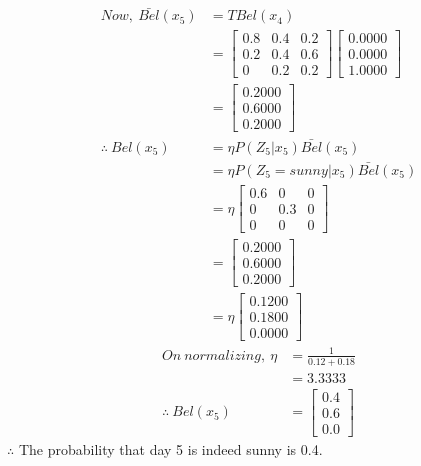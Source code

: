 \documentclass[a4paper,fleqn,11pt]{article}
\theoremstyle{mytheor}
\begin{document}
\begin{align*}
Now,\ \bar{Bel}(x_5) & = T Bel (x_4) \\
					  & = \begin{bmatrix}
								0.8 & 0.4 & 0.2 \\
								0.2 & 0.4 & 0.6 \\
								0   & 0.2 & 0.2
						  \end{bmatrix}
						  \begin{bmatrix}
								0.0000 \\
								0.0000 \\
								1.0000
						  \end{bmatrix} \\
					 & = \begin{bmatrix}
							0.2000 \\
							0.6000 \\
							0.2000
						 \end{bmatrix} \\
\therefore\ Bel(x_5) & = \eta P (Z_5 | x_{5}) \bar{Bel} (x_{5}) \\
					  & = \eta P (Z_5 = sunny | x_{5}) \bar{Bel} (x_{5}) \\
					  & = \eta 
					  	  \begin{bmatrix}
						  	  	0.6 & 0   & 0 \\
					  		  	0   & 0.3 & 0 \\
					  	  		0   & 0   & 0
					  	  \end{bmatrix} \\
					 & = \begin{bmatrix}
							0.2000 \\
							0.6000 \\
							0.2000
						 \end{bmatrix} \\
				   & = \eta
				  	    \begin{bmatrix}
								0.1200 \\
								0.1800 \\
								0.0000
						 \end{bmatrix}
\end{align*}
\begin{align*}
On\ normalizing,\ \eta & = \frac{1}{0.12 + 0.18} \\
& = 3.3333 \\
\therefore\ Bel(x_5) & = \begin{bmatrix}
								0.4 \\
								0.6 \\
								0.0
						   \end{bmatrix}
\end{align*}
$\therefore$ The probability that day 5 is indeed sunny is 0.4.
\end{document}
